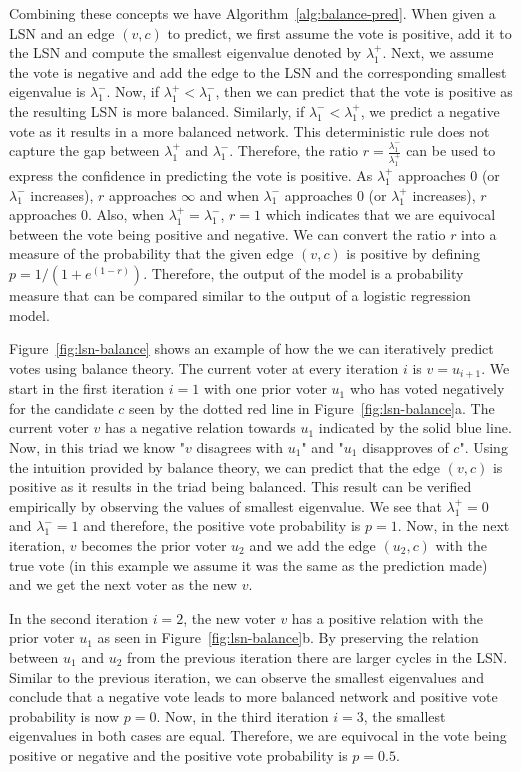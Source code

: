 Combining these concepts we have Algorithm~\ref{alg:balance-pred}. When given a LSN and an edge $(v,c)$ to predict, we first assume the vote is positive, add it to the LSN and compute the smallest eigenvalue denoted by $\lambda_1^{+}$. Next, we assume the vote is negative and add the edge to the LSN and the corresponding smallest eigenvalue is $\lambda_1^-$. Now, if $\lambda_1^+ < \lambda_1^-$, then we can predict that the vote is positive as the resulting LSN is more balanced. Similarly, if $\lambda_1^-<\lambda_1^+$, we predict a negative vote as it results in a more balanced network. This deterministic rule does not capture the gap between $\lambda_1^+$ and $\lambda_1^-$. Therefore, the ratio $r=\frac{\lambda_1^-}{\lambda_1^+}$ can be used to express the confidence in predicting the vote is positive. As $\lambda_1^+$ approaches $0$ (or $\lambda_1^-$ increases), $r$ approaches $\infty$ and when $\lambda_1^-$ approaches $0$ (or $\lambda_1^+$ increases), $r$ approaches $0$. Also, when $\lambda_1^+=\lambda_1^-$, $r=1$ which indicates that we are equivocal between the vote being positive and negative. We can convert the ratio $r$ into a measure of the probability that the given edge $(v,c)$ is positive by defining $p=1/(1+e^{(1-r)})$. Therefore, the output of the model is a probability measure that can be compared similar to the output of a logistic regression model.

Figure~\ref{fig:lsn-balance} shows an example of how the we can iteratively predict votes using balance theory. The current voter at every iteration $i$ is $v=u_{i+1}$. We start in the first iteration $i=1$ with one prior voter $u_1$ who has voted negatively for the candidate $c$ seen by the dotted red line in Figure~\ref{fig:lsn-balance}a. The current voter $v$ has a negative relation towards $u_1$ indicated by the solid blue line. Now, in this triad we know "$v$ disagrees with $u_1$" and "$u_1$ disapproves of $c$". Using the intuition provided by balance theory, we can predict that the edge $(v,c)$ is positive as it results in the triad being balanced. This result can be verified empirically by observing the values of smallest eigenvalue. We see that $\lambda_1^+=0$ and $\lambda_1^-=1$ and therefore, the positive vote probability is $p=1$. Now, in the next iteration, $v$ becomes the prior voter $u_2$ and we add the edge $(u_2,c)$ with the true vote (in this example we assume it was the same as the prediction made) and we get the next voter as the new $v$.

In the second iteration $i=2$, the new voter $v$ has a positive relation with the prior voter $u_1$ as seen in Figure~\ref{fig:lsn-balance}b. By preserving the relation between $u_1$ and $u_2$ from the previous iteration there are larger cycles in the LSN. Similar to the previous iteration, we can observe the smallest eigenvalues and conclude that a negative vote leads to more balanced network and positive vote probability is now $p=0$. Now, in the third iteration $i=3$, the smallest eigenvalues in both cases are equal. Therefore, we are equivocal in the vote being positive or negative and the positive vote probability is $p=0.5$.

